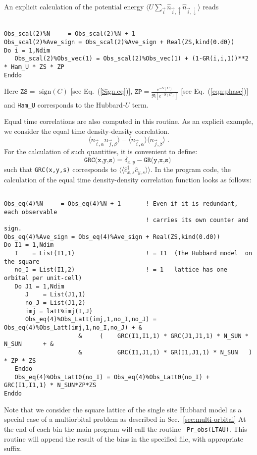 An explicit calculation of the   potential energy  $ \langle U \sum_{\vec{i}}  \hat{n}_{\vec{i},\uparrow}   \hat{n}_{\vec{i},\downarrow}  \rangle $ reads 

\begin{lstlisting} 

Obs_scal(2)%N     = Obs_scal(2)%N + 1
Obs_scal(2)%Ave_sign = Obs_scal(2)%Ave_sign + Real(ZS,kind(0.d0))
Do i = 1,Ndim
   Obs_scal(2)%Obs_vec(1) = Obs_scal(2)%Obs_vec(1) + (1-GR(i,i,1))**2 * Ham_U * ZS * ZP
Enddo

\end{lstlisting} 
Here  $ \texttt{ZS} = \text{ sign} (C) $  [see Eq.~(\ref{Sign.eq})],  $ \texttt{ZP} =   \frac{e^{-S(C)}} {\Re \left[e^{-S(C)} \right]}   $ [see Eq.~(\ref{eqn:phase})] and  \texttt{Ham\_U}  corresponds to the Hubbard-$U$ term.


Equal time correlations  are also computed in this routine. As an explicit example, we  consider the equal time density-density correlation.
\begin{equation}
	 \langle n_{\vec{i},\alpha}   n_{\vec{j},\beta} \rangle   -  \langle n_{\vec{i},\alpha} \rangle  \langle    n_{\vec{j},\beta}  \rangle \;.
\end{equation} 
For the calculation of such quantities, it is convenient to  define: 
\begin{equation}
\label{GRC.eq}
	\texttt{GRC(x,y,s)}   =  \delta_{x,y}  - \texttt{GR(y,x,s)  }
\end{equation}
such that \texttt{GRC(x,y,s)}    corresponds to  $ \langle \langle  \hat{c}_{x,s}^{\dagger}\hat{c}_{y,s}^{\phantom\dagger} \rangle \rangle $. 
In the program code, the calculation of the equal time density-density correlation function looks as follows:
\begin{lstlisting} 

Obs_eq(4)%N     = Obs_eq(4)%N + 1       ! Even if it is redundant, each observable  
                                        ! carries its own counter and sign.
Obs_eq(4)%Ave_sign = Obs_eq(4)%Ave_sign + Real(ZS,kind(0.d0))  
Do I1 = 1,Ndim
   I    = List(I1,1)                    ! = I1  (The Hubbard model  on the square
   no_I = List(I1,2)                    ! = 1   lattice has one orbital per unit-cell)
   Do J1 = 1,Ndim                       
      J    = List(J1,1)
      no_J = List(J1,2)
      imj = latt%imj(I,J)
      Obs_eq(4)%Obs_Latt(imj,1,no_I,no_J) =  Obs_eq(4)%Obs_Latt(imj,1,no_I,no_J) + &
                     &     (    GRC(I1,I1,1) * GRC(J1,J1,1) * N_SUN * N_SUN      + &
                     &          GRC(I1,J1,1) * GR(I1,J1,1) * N_SUN   ) * ZP * ZS 
   Enddo
   Obs_eq(4)%Obs_Latt0(no_I) = Obs_eq(4)%Obs_Latt0(no_I) + GRC(I1,I1,1) * N_SUN*ZP*ZS
Enddo
\end{lstlisting} 
Note that we consider the  square lattice of the single site Hubbard model as a special case of a multiorbital problem as described in Sec.~\ref{sec:multi-orbital}
At the end of each bin  the main program will call the routine \texttt{ Pr\_obs(LTAU)}. This routine will append the result of the bins in the specified file,  with appropriate suffix. 

